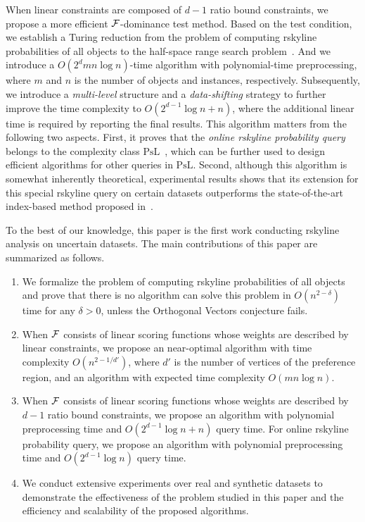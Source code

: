 When linear constraints are composed of $d - 1$ ratio bound constraints, we propose a more efficient $\mathcal{F}$-dominance test method.
Based on the test condition, we establish a Turing reduction from the problem of computing rskyline probabilities of all objects to the half-space range search problem~\cite{agarwal2017simplex}.
And we introduce a $O(2^dmn\log{n})$-time algorithm with polynomial-time preprocessing, where $m$ and $n$ is the number of objects and instances, respectively.
Subsequently, we introduce a \textit{multi-level} structure and a \textit{data-shifting} strategy to further improve the time complexity to $O(2^{d-1}\log{n} + n)$, where the additional linear time is required by reporting the final results.
This algorithm matters from the following two aspects.
First, it proves that the \textit{online rskyline probability query} belongs to the complexity class $\mathrm{PsL}$~\cite{DBLP:journals/tcs/GaoLML20}, which can be further used to design efficient algorithms for other queries in $\mathrm{PsL}$.
Second, although this algorithm is somewhat inherently theoretical, experimental results shows that its extension for this special rskyline query on certain datasets outperforms the state-of-the-art index-based method proposed in~\cite{DBLP:conf/icde/Liu0ZP021}.


To the best of our knowledge, this paper is the first work conducting rskyline analysis on uncertain datasets.
The main contributions of this paper are summarized as follows.
\begin{enumerate}[$\bullet$]
	\item We formalize the problem of computing rskyline probabilities of all objects and prove that there is no algorithm can solve this problem in $O(n^{2-\delta})$ time for any $\delta > 0$, unless the Orthogonal Vectors conjecture fails.
	\item When $\mathcal{F}$ consists of linear scoring functions whose weights are described by linear constraints, we propose an near-optimal algorithm with time complexity $O(n^{2 - 1/d'})$, where $d'$ is the number of vertices of the preference region, and an algorithm with expected time complexity $O(mn\log{n})$.
	\item When $\mathcal{F}$ consists of linear scoring functions whose weights are described by $d-1$ ratio bound constraints, we propose an algorithm with polynomial preprocessing time and $O(2^{d-1}\log{n} + n)$ query time.
    For online rskyline probability query, we propose an algorithm with polynomial preprocessing time and $O(2^{d-1}\log{n})$ query time.
	\item We conduct extensive experiments over real and synthetic datasets to demonstrate the effectiveness of the problem studied in this paper and the efficiency and scalability of the proposed algorithms.
\end{enumerate}

